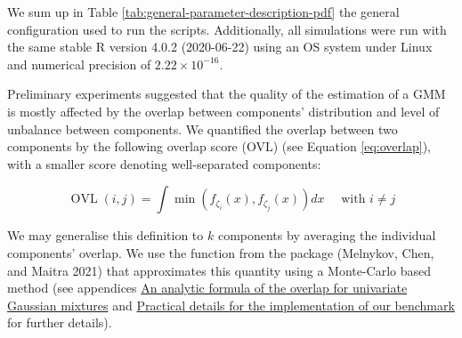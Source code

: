 We sum up in Table \ref{tab:general-parameter-description-pdf} the general configuration used to run the scripts. Additionally, all simulations were run with the same stable R version 4.0.2 (2020-06-22) using an OS system under Linux and numerical precision of \(2.22 \times 10^{-16}\).

\begin{table}[!h]

\caption{\label{tab:general-parameter-description-pdf}Global options shared by all the benchmarked packages.}
\centering
{}
\end{table}

Preliminary experiments suggested that the quality of the estimation of a
GMM is mostly affected by the overlap between components' distribution
and level of unbalance between components. We quantified the overlap between two components by the following overlap score (OVL) (see Equation \eqref{eq:overlap}), with a smaller score denoting well-separated components:

\begin{equation}
       \operatorname{OVL}(i, j) = \int \min (f_{\zeta_i} (x), f_{\zeta_j} (x)) dx \quad \text{ with } i \neq j
  \label{eq:overlap}
\end{equation}

We may generalise this definition to \(k\) components by averaging the
individual components' overlap. We use the function
 from the  package (Melnykov, Chen, and Maitra 2021) that approximates this quantity using a Monte-Carlo based method (see appendices \protect\hyperlink{an-analytic-formula-of-the-overlap-for-univariate-gaussian-mixtures}{An analytic formula of the overlap for univariate Gaussian mixtures} and \protect\hyperlink{practical-details-for-the-implementation-of-our-benchmark}{Practical details for the implementation of our benchmark} for further details).

